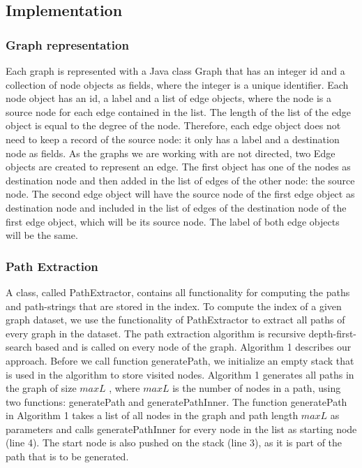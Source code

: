 \documentclass{l4proj}
\begin{document}
\subsection{Implementation}
\label{path-index:implementation}
\subsubsection{Graph representation}
\label{path-index:graph-representation}
	Each graph is represented with a Java class \textrm{Graph} that has an integer id and a collection of node objects as fields, where the integer is a unique identifier. Each node object has an id, a label and a list of edge objects, where the node is a source node for each edge contained in the list. The length of the list of the edge object is equal to the degree of the node. Therefore, each edge object does not need to keep a record of the source node: it only has a label and a destination node as fields. As the graphs we are working with are not directed, two Edge objects are created to represent an edge. The first object has one of the nodes as destination node and then added in the list of edges of the other node: the source node. The second edge object will have the source node of the first edge object as destination node and included in the list of edges of the destination node of the first edge object, which will be its source node. The label of both edge objects will be the same.\par
\subsubsection{Path Extraction}
\label{path-index:path-extraction}
A class, called \textrm{PathExtractor}, contains all functionality for computing the paths and path-strings that are stored in the index. To compute the index of a given graph dataset, we use the functionality of \textrm{PathExtractor} to extract all paths of every graph in the dataset. The path extraction algorithm is recursive depth-first-search based and is called on every node of the graph. Algorithm 1 describes our approach. Before we call function \textrm{generatePath}, we initialize an empty stack that is used in the algorithm to store visited nodes. \textrm{Algorithm 1} generates all paths in the graph of size $maxL$ , where $maxL$ is the number of nodes in a path, using two functions: \textrm{generatePath} and \textrm{generatePathInner}. The function \textrm{generatePath} in \textrm{Algorithm 1} takes a list of all nodes in the graph and path length $maxL$ as parameters and calls \textrm{generatePathInner} for every node in the list as starting node (line 4). The start node is also pushed on the stack (line 3), as it is part of the path that is to be generated. \par
\end{document}
